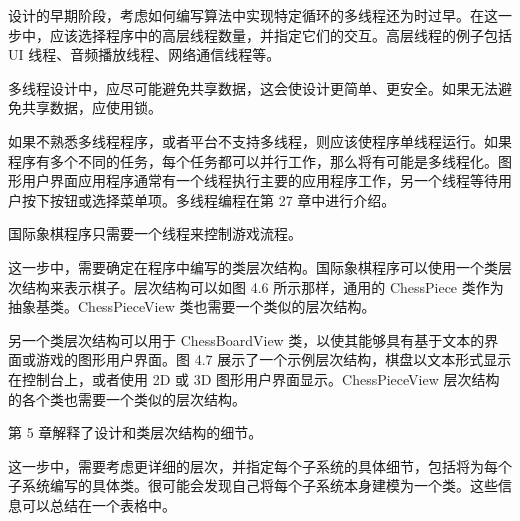 

设计的早期阶段，考虑如何编写算法中实现特定循环的多线程还为时过早。在这一步中，应该选择程序中的高层线程数量，并指定它们的交互。高层线程的例子包括 UI 线程、音频播放线程、网络通信线程等。

多线程设计中，应尽可能避免共享数据，这会使设计更简单、更安全。如果无法避免共享数据，应使用锁。

如果不熟悉多线程程序，或者平台不支持多线程，则应该使程序单线程运行。如果程序有多个不同的任务，每个任务都可以并行工作，那么将有可能是多线程化。图形用户界面应用程序通常有一个线程执行主要的应用程序工作，另一个线程等待用户按下按钮或选择菜单项。多线程编程在第 27 章中进行介绍。

国际象棋程序只需要一个线程来控制游戏流程。


这一步中，需要确定在程序中编写的类层次结构。国际象棋程序可以使用一个类层次结构来表示棋子。层次结构可以如图 4.6 所示那样，通用的 ChessPiece 类作为抽象基类。ChessPieceView 类也需要一个类似的层次结构。


另一个类层次结构可以用于 ChessBoardView 类，以使其能够具有基于文本的界面或游戏的图形用户界面。图 4.7 展示了一个示例层次结构，棋盘以文本形式显示在控制台上，或者使用 2D 或 3D 图形用户界面显示。ChessPieceView 层次结构的各个类也需要一个类似的层次结构。


第 5 章解释了设计和类层次结构的细节。


这一步中，需要考虑更详细的层次，并指定每个子系统的具体细节，包括将为每个子系统编写的具体类。很可能会发现自己将每个子系统本身建模为一个类。这些信息可以总结在一个表格中。

